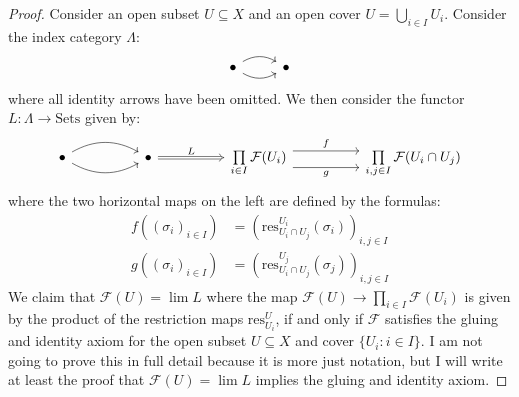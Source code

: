 \documentclass{amsart}
\begin{document}
\begin{proof}
    Consider an open subset $U\subseteq X$ and an open cover $U=\bigcup_{i\in I}U_i$. Consider the index category $\Lambda$:
    \begin{equation*}
        \begin{tikzcd}
            \bullet \arrow[r, bend right] \arrow[r, bend left] & \bullet
        \end{tikzcd}
    \end{equation*}
    where all identity arrows have been omitted. We then consider the functor $L:\Lambda\rightarrow\mathrm{Sets}$ given by:
    \begin{equation*}
        \begin{tikzcd}
            \bullet \arrow[rr, bend left,] \arrow[rr, bend right,] & & \bullet \arrow[rr, Rightarrow, "L"] & & \prod\limits_{i\in I}\mathcal{F}(U_i) \arrow[rr, shift left = 2, "f"] \arrow[rr, shift right = 3, "g"'] & & \prod\limits_{i, j\in I} \mathcal{F}(U_i\cap U_j)
        \end{tikzcd}
    \end{equation*}
    where the two horizontal maps on the left are defined by the formulas:
    \begin{align*}
        f((\sigma_i)_{i\in I}) &= (\mathrm{res}^{U_{i}}_{U_i\cap U_j}(\sigma_i))_{i, j\in I} \\
        g((\sigma_i)_{i\in I}) &= (\mathrm{res}^{U_j}_{U_i\cap U_j}(\sigma_j))_{i, j\in I}
    \end{align*}
    We claim that $\mathcal{{F}}(U)=\lim L$ where the map $\mathcal{F}(U)\rightarrow \prod_{i\in I}\mathcal{F}(U_i)$ is given by the product of the restriction maps $\mathrm{res}^U_{U_i}$, if and only if $\mathcal{F}$ satisfies the gluing and identity axiom for the open subset $U\subseteq X$ and cover $\{U_i:i\in I\}$. I am not going to prove this in full detail because it is more just notation, but I will write at least the proof that $\mathcal{F}(U)=\lim L$ implies the gluing and identity axiom. 

    \vspace{0.1in}


\end{proof}
\end{document}
